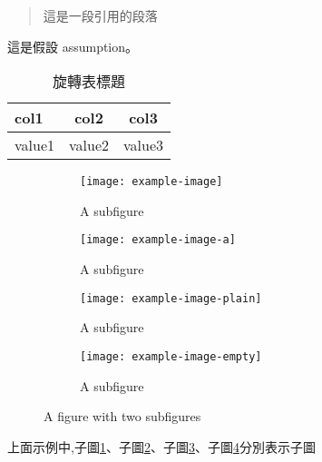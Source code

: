 \documentclass[writingLanguage=chinese,
    addPageTitle=on,
    addDeclaration=on,
    addMUSTlog=off,
    addFigTOC=on,   
    addTabTOC=on,
    refIndent=off,
    printMod=off,
]{.def/must}
\begin{document}
 \begin{quote}
     這是一段引用的段落
 \end{quote}

\begin{assumption}
這是假設 assumption。
\end{assumption}



\begin{sidewaystable}[!htp]
    \setlength{\tabcolsep}{10mm}
    \centering
    \caption{旋轉表標題}
    \begin{tabular}[l]{lcc}
    \toprule
        col1 & col2 & col3 \\
    \midrule
        value1 & value2 & value3 \\
    \bottomrule
    \end{tabular}
\end{sidewaystable}


\begin{figure}[H]
	\centering
	\begin{subfigure}{0.49\textwidth}
	  	\centering
            \texttt{[image: example-image]}
		\caption{A subfigure}
		\label{fig:sub1}
	\end{subfigure}
	\hfill
	\begin{subfigure}{.49\textwidth}
		\centering
            \texttt{[image: example-image-a]}
		\caption{A subfigure}
	  	\label{fig:sub2}
	\end{subfigure}
        \newline
	\begin{subfigure}{.49\textwidth}
		\centering
            \texttt{[image: example-image-plain]}
		\caption{A subfigure}
		\label{fig:sub3}
	\end{subfigure}
	\begin{subfigure}{.49\textwidth}
		\centering
            \texttt{[image: example-image-empty]}
		\caption{A subfigure}
		\label{fig:sub4}
	\end{subfigure}
	\caption{A figure with two subfigures}
	\label{fig:sub}
\end{figure}
上面示例中,子圖\ref{fig:sub1}、子圖\ref{fig:sub2}、子圖\ref{fig:sub3}、子圖\ref{fig:sub4}分別表示子圖
\end{document}
